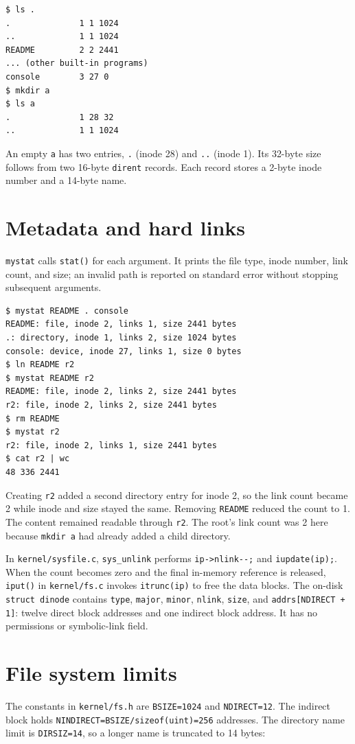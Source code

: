 \documentclass[12pt]{article}
\begin{document}
\begin{lstlisting}
$ ls .
.              1 1 1024
..             1 1 1024
README         2 2 2441
... (other built-in programs)
console        3 27 0
$ mkdir a
$ ls a
.              1 28 32
..             1 1 1024
\end{lstlisting}

An empty \texttt{a} has two entries, \texttt{.} (inode 28) and \texttt{..}
(inode 1). Its 32-byte size follows from two 16-byte \texttt{dirent}
records. Each record stores a 2-byte inode number and a 14-byte name.

\clearpage
\section{Metadata and hard links}
\texttt{mystat} calls \texttt{stat()} for each argument. It prints the file
type, inode number, link count, and size; an invalid path is reported on
standard error without stopping subsequent arguments.

\begin{lstlisting}
$ mystat README . console
README: file, inode 2, links 1, size 2441 bytes
.: directory, inode 1, links 2, size 1024 bytes
console: device, inode 27, links 1, size 0 bytes
$ ln README r2
$ mystat README r2
README: file, inode 2, links 2, size 2441 bytes
r2: file, inode 2, links 2, size 2441 bytes
$ rm README
$ mystat r2
r2: file, inode 2, links 1, size 2441 bytes
$ cat r2 | wc
48 336 2441
\end{lstlisting}

Creating \texttt{r2} added a second directory entry for inode 2, so the
link count became 2 while inode and size stayed the same. Removing
\texttt{README} reduced the count to 1. The content remained readable through
\texttt{r2}. The root's link count was 2 here because \texttt{mkdir a} had
already added a child directory.

In \texttt{kernel/sysfile.c}, \texttt{sys\_unlink} performs
\lstinline!ip->nlink--;! and \texttt{iupdate(ip);}. When the count becomes zero
and the final in-memory reference is released, \texttt{iput()} in
\texttt{kernel/fs.c} invokes \texttt{itrunc(ip)} to free the data blocks.
The on-disk \texttt{struct dinode} contains \texttt{type}, \texttt{major},
\texttt{minor}, \texttt{nlink}, \texttt{size}, and
\texttt{addrs[NDIRECT + 1]}: twelve direct block addresses and one indirect
block address. It has no permissions or symbolic-link field.

\clearpage
\section{File system limits}
The constants in \texttt{kernel/fs.h} are \texttt{BSIZE=1024} and
\texttt{NDIRECT=12}. The indirect block holds
\texttt{NINDIRECT=BSIZE/sizeof(uint)=256} addresses. The directory name
limit is \texttt{DIRSIZ=14}, so a longer name is truncated to 14 bytes:
\end{document}

